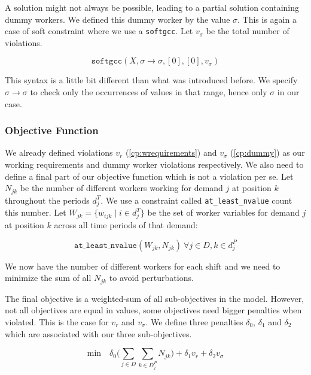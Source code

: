 \documentclass[../../thesis.tex]{subfiles}
\begin{document}
A solution might not always be possible, leading to a partial solution containing dummy workers.
We defined this dummy worker by the value $\sigma$. This is again a case of soft constraint where 
we use a \texttt{softgcc}. Let $v_{\sigma}$ be the total number of violations.


\begin{equation}
  \texttt{softgcc}(X, \sigma \rightarrow \sigma, [0], [0], v_{\sigma}) \label{cp:dummy}
\end{equation}

This syntax is a little bit different than what was introduced before. We specify $\sigma \rightarrow \sigma$ to check only the occurrences of values 
in that range, hence only $\sigma$ in our case.




\subsubsection{Objective Function}

We already defined violations $v_r$ (\ref{cp:wrequirements}) and $v_{\sigma}$ (\ref{cp:dummy}) as our working requirements and dummy worker violations respectively.
We also need to define a final part of our objective function which is not a violation per se. Let $N_{jk}$ be the number 
of different workers working for demand $j$ at position $k$ throughout the periods $d_j^T$. We use a 
constraint called \texttt{at\_least\_nvalue} \cite{nvalue} count this number.
Let  $W_{jk} = \{ w_{ijk} \mid i \in d^T_j \}$ be the set of worker variables for demand $j$ at position $k$ across all time periods of that demand:

\begin{equation}
  \texttt{at\_least\_nvalue}(W_{jk}, N_{jk}) \ \forall j \in D, k \in d^P_j
\end{equation}

We now have the number of different workers for each shift and we need to minimize the sum of all $N_{jk}$ to avoid perturbations.

The final objective is a weighted-sum of all sub-objectives in the model. However, not all objectives are equal 
in values, some objectives need bigger penalties when violated. This is the case for $v_r$ and $v_{\sigma}$.
We define three penalties $\delta_0$, $\delta_1$ and $\delta_2$ which are associated with our three sub-objectives.

\begin{equation}
  \text{min} \quad \delta_0 \big( \sum_{j \in D} \sum_{k \in D^P_j} N_{jk} \big) + \delta_1 v_r + \delta_2 v_{\sigma} \label{cp:objective}
\end{equation}
\end{document}

